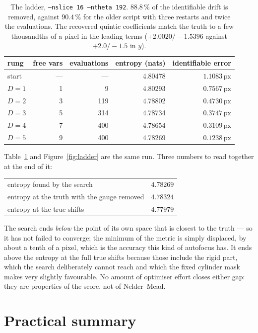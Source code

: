 \documentclass[11pt,a4paper]{article}
\newcommand{\px}{\,\text{px}}
\begin{document}
\begin{table}[htb]
\centering
\begin{tabular}{lrrrr}
\toprule
rung & free vars & evaluations & entropy (nats) & identifiable error \\
\midrule
start  & --- & ---  & 4.80478 & $1.1083\px$ \\
$D=1$  &  1  &    9 & 4.80293 & $0.7567\px$ \\
$D=2$  &  3  &  119 & 4.78802 & $0.4730\px$ \\
$D=3$  &  5  &  314 & 4.78734 & $0.3747\px$ \\
$D=4$  &  7  &  400 & 4.78654 & $0.3109\px$ \\
$D=5$  &  9  &  400 & 4.78269 & $0.1238\px$ \\
\bottomrule
\end{tabular}
\caption{The ladder, \texttt{--nslice 16 --ntheta 192}.  $88.8\,\%$ of the
identifiable drift is removed, against $90.4\,\%$ for the older script with
three restarts and twice the evaluations.  The recovered quintic coefficients
match the truth to a few thousandths of a pixel in the leading terms
($+2.0020/-1.5396$ against $+2.0/-1.5$ in $y$).}
\label{tab:ladder}
\end{table}

Table~\ref{tab:ladder} and Figure~\ref{fig:ladder} are the same run.  Three
numbers to read together at the end of it:
\begin{center}
\begin{tabular}{lr}
\toprule
entropy found by the search                      & $4.78269$ \\
entropy at the truth with the gauge removed      & $4.78324$ \\
entropy at the true shifts                       & $4.77979$ \\
\bottomrule
\end{tabular}
\end{center}
The search ends \emph{below} the point of its own space that is closest to the
truth --- so it has not failed to converge; the minimum of the metric is
simply displaced, by about a tenth of a pixel, which is the accuracy this kind
of autofocus has.  It ends above the entropy at the full true shifts because
those include the rigid part, which the search deliberately cannot reach and
which the fixed cylinder mask makes very slightly favourable.  No amount of
optimiser effort closes either gap: they are properties of the score, not of
Nelder--Mead.

\section{Practical summary}
\end{document}
